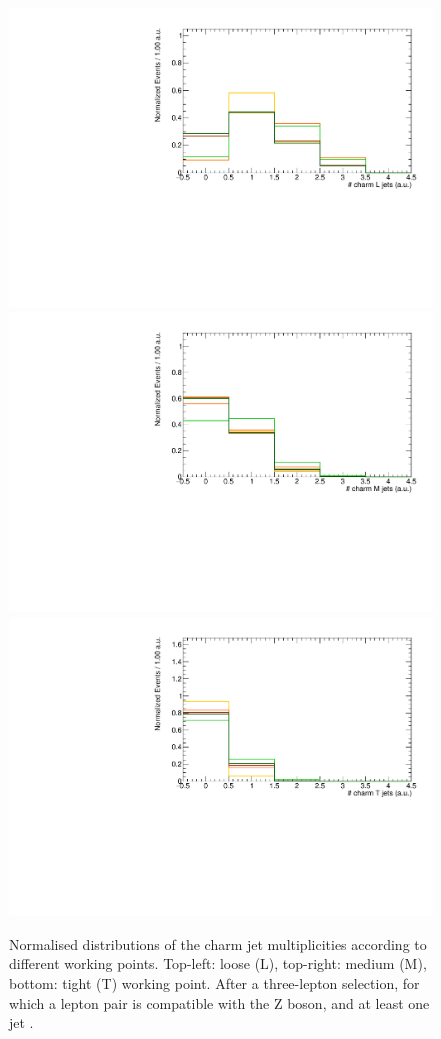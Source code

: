 \begin{figure}[htbp]
	\centering
	\includegraphics[width=0.49\linewidth]{7_Conclusion/Figures/charmtagging/3lepcontrol_dilep_nJetsCharmL_all_Normalized}
	\includegraphics[width=0.49\linewidth]{7_Conclusion/Figures/charmtagging/3lepcontrol_dilep_nJetsCharmM_all_Normalized}
	\includegraphics[width=0.49\linewidth]{7_Conclusion/Figures/charmtagging/3lepcontrol_dilep_nJetsCharmT_all_Normalized}
	\caption{Normalised distributions of the charm jet multiplicities according to different working points. Top-left: loose (L), top-right: medium (M), bottom:  tight (T) working point. After a three-lepton selection, for which a lepton pair is compatible with the Z boson, and at least one jet .}
	\label{fig:charm}
\end{figure}

